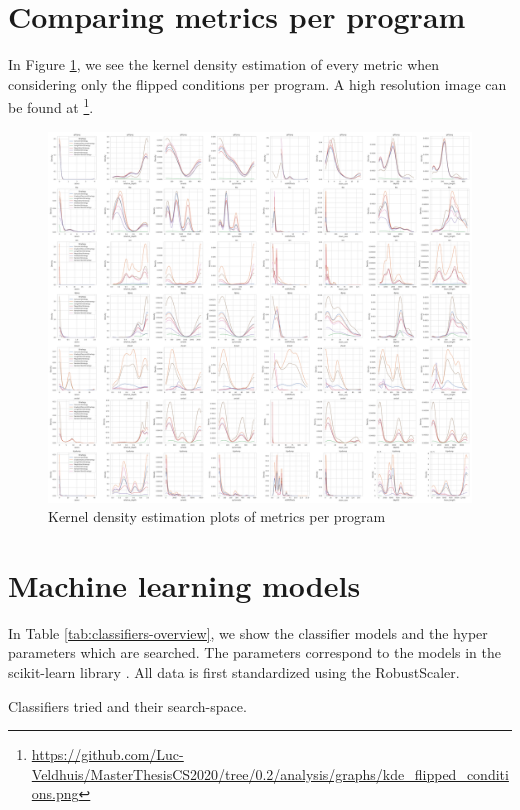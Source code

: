 \section{Comparing metrics per program}
In Figure \ref{fig:kde-flipped-conditions}, we see the kernel density estimation of every metric when considering only the flipped conditions per program. A high resolution image can be found at \footnote{\url{https://github.com/Luc-Veldhuis/MasterThesisCS2020/tree/0.2/analysis/graphs/kde_flipped_conditions.png}}.
\begin{figure}[p]
    \centering
    \includegraphics[width=\textheight,height=\textwidth,keepaspectratio, angle=90]{5_results/graphs_new/kde_flipped_conditions.png}  
    \caption{Kernel density estimation plots of metrics per program}
    \label{fig:kde-flipped-conditions}
\end{figure}

\section{Machine learning models}\label{appendix:models}
In Table \ref{tab:classifiers-overview}, we show the classifier models and the hyper parameters which are searched. The parameters correspond to the models in the scikit-learn library \cite{scikit-learn}. All data is first standardized using the RobustScaler.
\begin{table}[H]
\centering

\caption{Classifiers tried and their search-space.}\label{tab:classifiers-overview}
\end{table}

